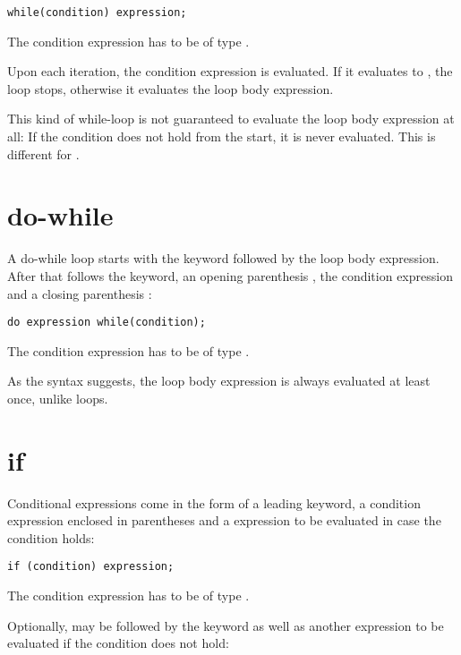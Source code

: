 \begin{lstlisting}
while(condition) expression;
\end{lstlisting}

The condition expression has to be of type .

Upon each iteration, the condition expression is evaluated. If it evaluates to , the loop stops, otherwise it evaluates the loop body expression.


This kind of while-loop is not guaranteed to evaluate the loop body expression at all: If the condition does not hold from the start, it is never evaluated. This is different for .

\section{do-while}
\label{expression-do-while}

A do-while loop starts with the  keyword followed by the loop body expression. After that follows the  keyword, an opening parenthesis \expr{(}, the condition expression and a closing parenthesis \expr{)}:

\begin{lstlisting}
do expression while(condition);
\end{lstlisting}

The condition expression has to be of type .

As the syntax suggests, the loop body expression is always evaluated at least once, unlike  loops.

\section{if}
\label{expression-if}

Conditional expressions come in the form of a leading  keyword, a condition expression enclosed in parentheses \expr{()} and a expression to be evaluated in case the condition holds:

\begin{lstlisting}
if (condition) expression;
\end{lstlisting}

The condition expression has to be of type .

Optionally,  may be followed by the  keyword as well as another expression to be evaluated if the condition does not hold:

